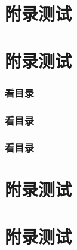



	
\section{附录测试}



\section{附录测试}

\subsubsection{看目录}

\subsubsection{看目录}

\subsubsection*{看目录}




\section{附录测试}




{\FontSizeSet[1.2]{14pt}\zhlipsum[1]}

	




	
\section{附录测试}
	




